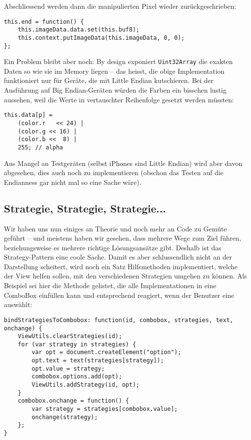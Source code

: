 \documentclass[11pt]{scrreprt} %
\theoremstyle{definition}
\begin{document}
Abschliessend werden dann die manipulierten Pixel wieder zurückgeschrieben:

\begin{lstlisting}
this.end = function() {
	this.imageData.data.set(this.buf8);
	this.context.putImageData(this.imageData, 0, 0);
};
\end{lstlisting}

Ein Problem bleibt aber noch: By design exponiert {\tt Uint32Array} die exakten Daten so wie sie im Memory liegen -- das heisst, die obige Implementation funktioniert nur für Geräte, die mit Little Endian kutschieren. Bei der Ausführung auf Big Endian-Geräten würden die Farben ein bisschen lustig aussehen, weil die Werte in vertauschter Reihenfolge gesetzt werden müssten:

\begin{lstlisting}
this.data[p] =
	(color.r   << 24) |
	(color.g << 16) |
	(color.b <<  8) |
	255; // alpha
\end{lstlisting}

Aus Mangel an Testgeräten (selbst iPhones sind Little Endian) wird aber davon abgesehen, dies auch noch zu implementieren (obschon das Testen auf die Endianness gar nicht mal so eine Sache wäre). \cite{mdn:PixelCanvas}

\subsection{Strategie, Strategie, Strategie...}

Wir haben uns nun einiges an Theorie und noch mehr an Code zu Gemüte geführt -- und meistens haben wir gesehen, dass mehrere Wege zum Ziel führen, beziehungsweise es mehrere richtige Lösungsansätze gibt. Deshalb ist das Strategy-Pattern eine coole Sache. Damit es aber schlussendlich nicht an der Darstellung scheitert, wird noch ein Satz Hilfsmethoden implementiert, welche der View helfen sollen, mit den verschiedenen Strategien umgehen zu können. Als Beispiel sei hier die Methode gelistet, die alle Implementationen in eine ComboBox einfüllen kann und entsprechend reagiert, wenn der Benutzer eine auswählt:

\begin{lstlisting}
bindStrategiesToCombobox: function(id, combobox, strategies, text, onchange) {
	ViewUtils.clearStrategies(id);
	for (var strategy in strategies) {
		var opt = document.createElement("option");
		opt.text = text(strategies[strategy]);
		opt.value = strategy;
		combobox.options.add(opt);
		ViewUtils.addStrategy(id, opt);
	}
	combobox.onchange = function() {
		var strategy = strategies[combobox.value];
		onchange(strategy);
	};
}
\end{lstlisting}
\end{document}
